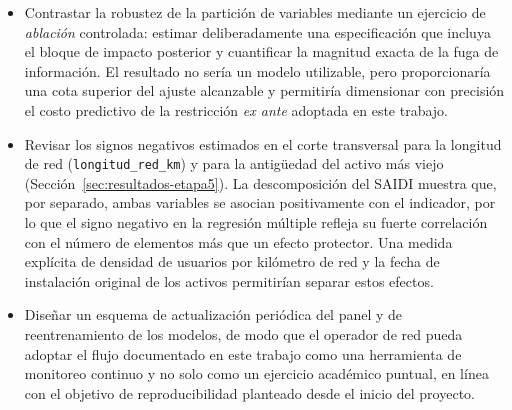 \begin{itemize}
    \item Contrastar la robustez de la partición de variables mediante un ejercicio de \emph{ablación} controlada: estimar deliberadamente una especificación que incluya el bloque de impacto posterior y cuantificar la magnitud exacta de la fuga de información. El resultado no sería un modelo utilizable, pero proporcionaría una cota superior del ajuste alcanzable y permitiría dimensionar con precisión el costo predictivo de la restricción \emph{ex ante} adoptada en este trabajo.

    \item Revisar los signos negativos estimados en el corte transversal para la longitud de red (\texttt{longitud\_red\_km}) y para la antigüedad del activo más viejo (Sección~\ref{sec:resultados-etapa5}). La descomposición del SAIDI muestra que, por separado, ambas variables se asocian positivamente con el indicador, por lo que el signo negativo en la regresión múltiple refleja su fuerte correlación con el número de elementos más que un efecto protector. Una medida explícita de densidad de usuarios por kilómetro de red y la fecha de instalación original de los activos permitirían separar estos efectos.

    \item Diseñar un esquema de actualización periódica del panel y de reentrenamiento de los modelos, de modo que el operador de red pueda adoptar el flujo documentado en este trabajo como una herramienta de monitoreo continuo y no solo como un ejercicio académico puntual, en línea con el objetivo de reproducibilidad planteado desde el inicio del proyecto.
\end{itemize}
